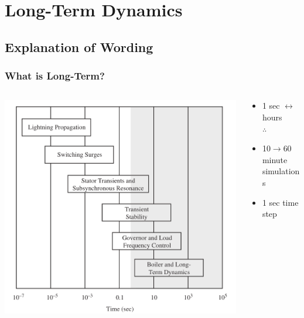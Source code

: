 \documentclass[14pt, unknownkeysallowed]{beamer}
\begin{document}
\section{Long-Term Dynamics}
\subsection{Explanation of Wording}
\begin{frame}
\frametitle{What is Long-Term?}
\begin{columns}
	\begin{column}{0.7\textwidth}
		\begin{center}
			\includegraphics[height=.8\textheight]{timeScalesHL}{\tiny\cite{SauerPaiChow}} 
		\end{center}
	\end{column}
	\begin{column}{0.5\textwidth}
	   \begin{itemize}
			\small
			\item 1 sec $\leftrightarrow$ hours \\
			$\therefore$ 
			\item 10$\rightarrow$60 minute simulations
			\item 1 sec time step
	\end{itemize}
	\end{column}

\end{columns}
\end{frame}
\end{document}
